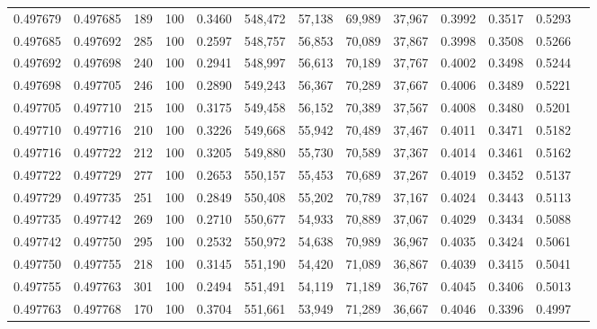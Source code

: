 \begin{tabular}{rrrrrrrrrrrrr}
0.497679 & 0.497685 &   189 & 100 &                                     0.3460 & 548,472 &  57,138 &  69,989 &  37,967 & 0.3992 & 0.3517 & 0.5293 \\
0.497685 & 0.497692 &   285 & 100 &                                     0.2597 & 548,757 &  56,853 &  70,089 &  37,867 & 0.3998 & 0.3508 & 0.5266 \\
0.497692 & 0.497698 &   240 & 100 &                                     0.2941 & 548,997 &  56,613 &  70,189 &  37,767 & 0.4002 & 0.3498 & 0.5244 \\
0.497698 & 0.497705 &   246 & 100 &                                     0.2890 & 549,243 &  56,367 &  70,289 &  37,667 & 0.4006 & 0.3489 & 0.5221 \\
0.497705 & 0.497710 &   215 & 100 &                                     0.3175 & 549,458 &  56,152 &  70,389 &  37,567 & 0.4008 & 0.3480 & 0.5201 \\
0.497710 & 0.497716 &   210 & 100 &                                     0.3226 & 549,668 &  55,942 &  70,489 &  37,467 & 0.4011 & 0.3471 & 0.5182 \\
0.497716 & 0.497722 &   212 & 100 &                                     0.3205 & 549,880 &  55,730 &  70,589 &  37,367 & 0.4014 & 0.3461 & 0.5162 \\
0.497722 & 0.497729 &   277 & 100 &                                     0.2653 & 550,157 &  55,453 &  70,689 &  37,267 & 0.4019 & 0.3452 & 0.5137 \\
0.497729 & 0.497735 &   251 & 100 &                                     0.2849 & 550,408 &  55,202 &  70,789 &  37,167 & 0.4024 & 0.3443 & 0.5113 \\
0.497735 & 0.497742 &   269 & 100 &                                     0.2710 & 550,677 &  54,933 &  70,889 &  37,067 & 0.4029 & 0.3434 & 0.5088 \\
0.497742 & 0.497750 &   295 & 100 &                                     0.2532 & 550,972 &  54,638 &  70,989 &  36,967 & 0.4035 & 0.3424 & 0.5061 \\
0.497750 & 0.497755 &   218 & 100 &                                     0.3145 & 551,190 &  54,420 &  71,089 &  36,867 & 0.4039 & 0.3415 & 0.5041 \\
0.497755 & 0.497763 &   301 & 100 &                                     0.2494 & 551,491 &  54,119 &  71,189 &  36,767 & 0.4045 & 0.3406 & 0.5013 \\
0.497763 & 0.497768 &   170 & 100 &                                     0.3704 & 551,661 &  53,949 &  71,289 &  36,667 & 0.4046 & 0.3396 & 0.4997 \\

\end{tabular}
